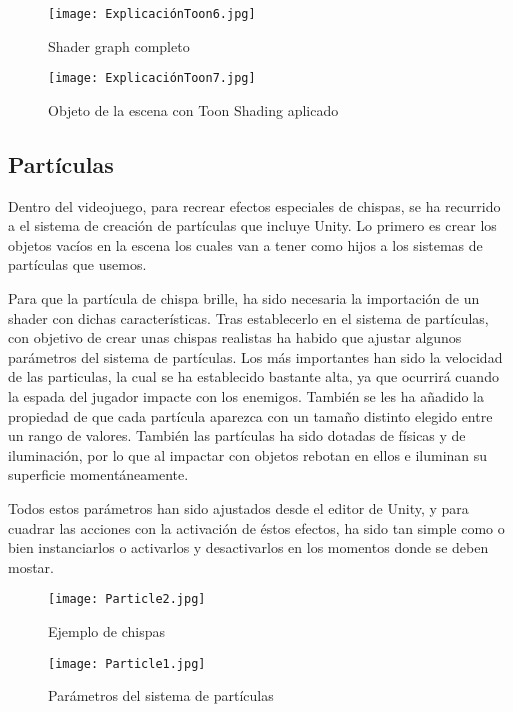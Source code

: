 \begin{figure}[H]
    \centering
    \texttt{[image: ExplicaciónToon6.jpg]}
    \caption{Shader graph completo}
\end{figure}

\begin{figure}[H]
    \centering
    \texttt{[image: ExplicaciónToon7.jpg]}
    \caption{Objeto de la escena con Toon Shading aplicado}
\end{figure}

\subsection{Partículas}

Dentro del videojuego, para recrear efectos especiales de chispas, se ha recurrido a el sistema de creación de partículas que incluye Unity. Lo primero es crear los objetos vacíos en la escena los cuales van a tener como hijos a los sistemas de partículas que usemos.

Para que la partícula de chispa brille, ha sido necesaria la importación de un shader con dichas características. Tras establecerlo en el sistema de partículas, con objetivo de crear unas chispas realistas ha habido que ajustar algunos parámetros del sistema de partículas. Los más importantes han sido la velocidad de las particulas, la cual se ha establecido bastante alta, ya que ocurrirá cuando la espada del jugador impacte con los enemigos. También se les ha añadido la propiedad de que cada partícula aparezca con un tamaño distinto elegido entre un rango  de valores. También las partículas ha sido dotadas de físicas y de iluminación, por lo que al impactar con objetos rebotan en ellos e iluminan su superficie momentáneamente.

Todos estos parámetros han sido ajustados desde el editor de Unity, y para cuadrar las acciones con la activación de éstos efectos, ha sido tan simple como o bien instanciarlos o activarlos y desactivarlos en los momentos donde se deben mostar.

\begin{figure}[H]
    \centering
    \texttt{[image: Particle2.jpg]}
    \caption{Ejemplo de chispas}
\end{figure}


\begin{figure}[H]
    \centering
    \texttt{[image: Particle1.jpg]}
    \caption{Parámetros del sistema de partículas}
\end{figure}

